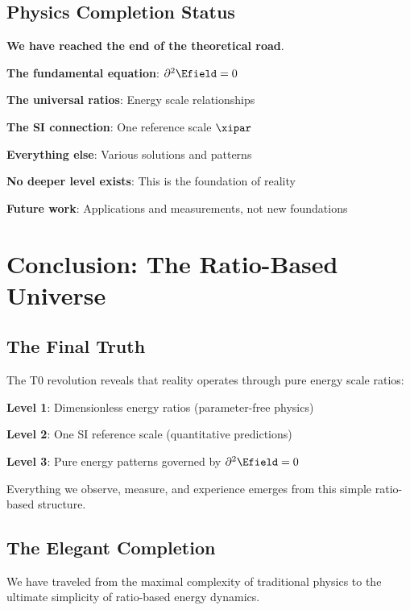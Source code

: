 	\subsection{Physics Completion Status}
	
	\begin{tcolorbox}[colback=yellow!5!white,colframe=orange!75!black,title=The End of Fundamental Physics]
		\textbf{We have reached the end of the theoretical road}.
		
		\textbf{The fundamental equation}: $\partial^2 \Efield = 0$
		
		\textbf{The universal ratios}: Energy scale relationships
		
		\textbf{The SI connection}: One reference scale $\xipar$
		
		\textbf{Everything else}: Various solutions and patterns
		
		\textbf{No deeper level exists}: This is the foundation of reality
		
		\textbf{Future work}: Applications and measurements, not new foundations
	\end{tcolorbox}
	
	\section{Conclusion: The Ratio-Based Universe}
	
	\subsection{The Final Truth}
	
	The T0 revolution reveals that reality operates through pure energy scale ratios:
	
	\textbf{Level 1}: Dimensionless energy ratios (parameter-free physics)
	
	\textbf{Level 2}: One SI reference scale (quantitative predictions)
	
	\textbf{Level 3}: Pure energy patterns governed by $\partial^2 \Efield = 0$
	
	Everything we observe, measure, and experience emerges from this simple ratio-based structure.
	
	\subsection{The Elegant Completion}
	
	We have traveled from the maximal complexity of traditional physics to the ultimate simplicity of ratio-based energy dynamics.
	
